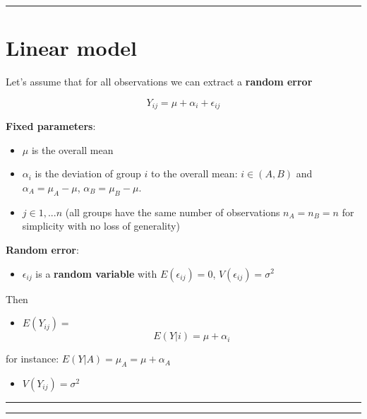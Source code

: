 \documentclass[
]{book}
\providecommand{\tightlist}{%
  \setlength{\itemsep}{0pt}\setlength{\parskip}{0pt}}
\begin{document}
\begin{center}\rule{0.5\linewidth}{0.5pt}\end{center}

\hypertarget{linear-model-1}{%
\section{Linear model}\label{linear-model-1}}

Let's assume that for all observations we can extract a
\textbf{random error}

\[Y_{ij} = \mu + \alpha_i +\epsilon_{ij}\]

\textbf{Fixed parameters}:

\begin{itemize}
\tightlist
\item
  \(\mu\) is the overall mean
\item
  \(\alpha_i\) is the deviation of group \(i\) to the overall mean: \(i \in (A,B)\) and \(\alpha_A=\mu_A-\mu\), \(\alpha_B=\mu_B-\mu\).
\item
  \(j \in {1,...n}\) (all groups have the same number of observations \(n_A=n_B=n\) for simplicity with no loss of generality)
\end{itemize}

\textbf{Random error}:

\begin{itemize}
\tightlist
\item
  \(\epsilon_{ij}\) is a \textbf{random variable} with \(E(\epsilon_{ij})=0\), \(V(\epsilon_{ij})=\sigma^2\)
\end{itemize}

Then

\begin{itemize}
\tightlist
\item
  \(E(Y_{ij})=\) \[E(Y|i)=\mu + \alpha_i\]
\end{itemize}

for instance: \(E(Y|A)=\mu_A=\mu + \alpha_A\)

\begin{itemize}
\tightlist
\item
  \(V(Y_{ij})=\sigma^2\)
\end{itemize}

\begin{center}\rule{0.5\linewidth}{0.5pt}\end{center}

\begin{center}\rule{0.5\linewidth}{0.5pt}\end{center}
\end{document}
